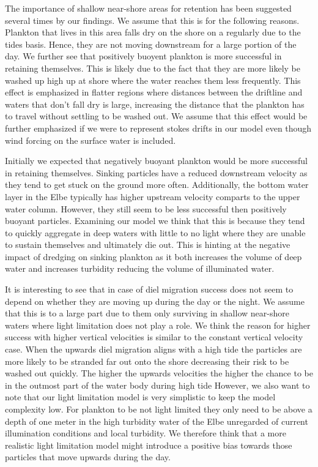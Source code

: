 The importance of shallow near-shore areas for retention has been suggested several times by our findings. 
We assume that this is for the following reasons.
Plankton that lives in this area falls dry on the shore on a regularly due to the tides basis. Hence, they are not moving downstream for a large portion of the day.
We further see that positively buoyent plankton is more successful in retaining themselves. 
This is likely due to the fact that they are more likely be washed up high up at shore where the water reaches them less frequently.
This effect is emphasized in flatter regions where distances between the driftline and waters that don't fall dry is large, increasing the distance that the plankton has to travel without settling to be washed out.
We assume that this effect would be further emphasized if we were to represent stokes drifts in our model even though wind forcing on the surface water is included.

Initially we expected that negatively buoyant plankton would be more successful in retaining themselves.
Sinking particles have a reduced downstream velocity as they tend to get stuck on the ground more often.
Additionally, the bottom water layer in the Elbe typically has higher upstream velocity comparts to the upper water column.
However, they still seem to be less successful then positively buoyant particles.
Examining our model we think  that this is because they tend to quickly aggregate in deep waters with little to no light where they are unable to sustain themselves and ultimately die out.
This is hinting at the negative impact of dredging on sinking plankton as it both increases the volume of deep water and increases turbidity reducing the volume of illuminated water.

It is interesting to see that in case of diel migration success does not seem to depend on whether they are moving up during the day or the night.
We assume that this is to a large part due to them only surviving in shallow near-shore waters where light limitation does not play a role.
We think the reason for higher success with higher vertical velocities is similar to the constant vertical velocity case.
When the upwards diel migration aligns with a high tide the particles are more likely to be stranded far out onto the shore decreasing their risk to be washed out quickly.
The higher the upwards velocities the higher the chance to be in the outmost part of the water body during high tide
However, we also want to note that our light limitation model is very simplistic to keep the model complexity low.
For plankton to be not light limited they only need to be above a depth of one meter in the high turbidity water of the Elbe unregarded of current illumination conditions and local turbidity.
We therefore think that a more realistic light limitation model might introduce a positive bias towards those particles that move upwards during the day.

